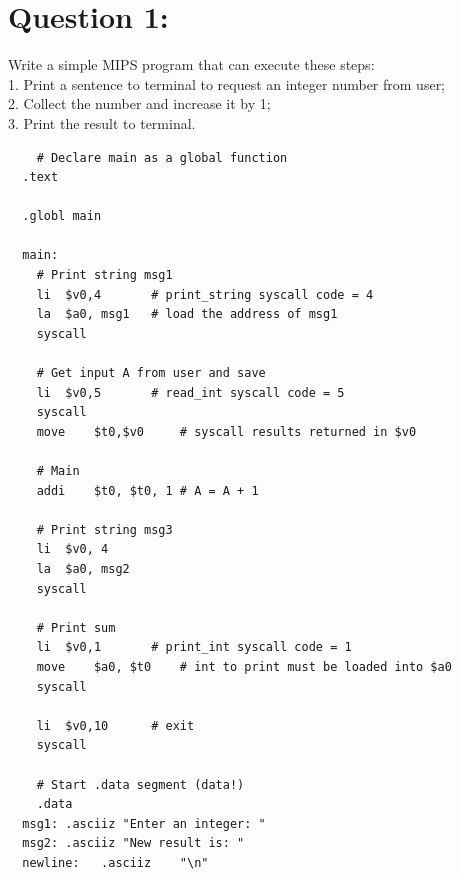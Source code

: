 \documentclass[12pt,a4paper]{article}
\begin{document}
\begin{titlepage}
\begin{center}
\begin{minipage}{0.4\textwidth}
\begin{flushright}
      \end{flushright}
    \end{minipage}

    \vfill

    \vspace{2cm}
    {\large} %
  \end{center}
\end{titlepage}


\section*{Question 1:}

Write a simple MIPS program that can execute these steps: \\
1. Print a sentence to terminal to request an integer number from user; \\
2. Collect the number and increase it by 1;\\
3. Print the result to terminal.


\begin{mdframed}[hidealllines=true,backgroundcolor=magenta!10]
  \begin{lstlisting}
    # Declare main as a global function
  .text

  .globl main

  main:
    # Print string msg1
    li	$v0,4		# print_string syscall code = 4
    la	$a0, msg1	# load the address of msg1
    syscall

    # Get input A from user and save
    li	$v0,5		# read_int syscall code = 5
    syscall
    move	$t0,$v0		# syscall results returned in $v0

    # Main
    addi	$t0, $t0, 1	# A = A + 1

    # Print string msg3
    li	$v0, 4
    la	$a0, msg2
    syscall

    # Print sum
    li	$v0,1		# print_int syscall code = 1
    move	$a0, $t0	# int to print must be loaded into $a0
    syscall

    li	$v0,10		# exit
    syscall

    # Start .data segment (data!)
    .data
  msg1:	.asciiz	"Enter an integer: "
  msg2:	.asciiz	"New result is: "
  newline:   .asciiz	"\n"

          \end{lstlisting}
\end{mdframed}

\end{document}
